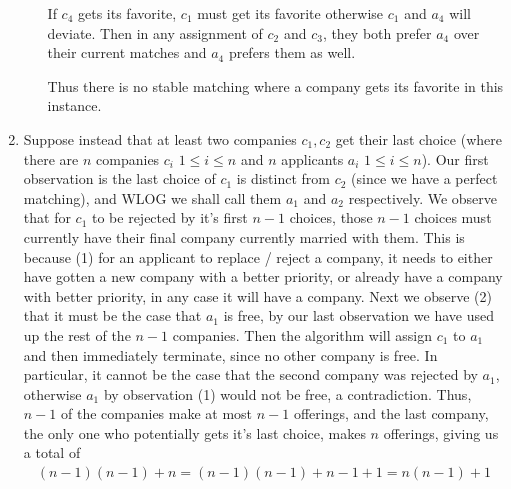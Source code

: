 \documentclass[12pt]{article}
\theoremstyle{definitionstyle}
\begin{document}
\begin{enumerate}[leftmargin=\labelsep]
\begin{enumerate}
			If $c_4$ gets its favorite, $c_1$ must get its favorite otherwise $c_1$ and $a_4$ will deviate. Then in any assignment of $c_2$ and $c_3$, they both prefer $a_4$ over their current matches and $a_4$ prefers them as well.
			
			Thus there is no stable matching where a company gets its favorite in this instance.
		\end{enumerate}
		\item Suppose instead that at least two companies $c_1, c_2$ get their last choice (where there are $n$ companies $c_i$ $1 \leq i \leq n$ and $n$ applicants $a_i$ $1 \leq i \leq n$). Our first observation is the last choice of $c_1$ is distinct from $c_2$ (since we have a perfect matching), and WLOG we shall call them $a_1$ and $a_2$ respectively. We observe that for $c_1$ to be rejected by it's first $n-1$ choices, those $n-1$ choices must currently have their final company currently married with them. This is because (1) for an applicant to replace / reject a company, it needs to either have gotten a new company with a better priority, or already have a company with better priority, in any case it will have a company. Next we observe (2) that it must be the case that $a_1$ is free, by our last observation we have used up the rest of the $n-1$ companies. Then the algorithm will assign $c_1$ to $a_1$ and then immediately terminate, since no other company is free. In particular, it cannot be the case that the second company was rejected by $a_1$, otherwise $a_1$ by observation (1) would not be free, a contradiction. Thus, $n-1$ of the companies make at most $n-1$ offerings, and the last company, the only one who potentially gets it's last choice, makes $n$ offerings, giving us a total of
		\begin{align*}
			(n-1)(n-1) + n = (n-1)(n-1) + n-1 + 1 = n(n-1) + 1
		\end{align*}
		

\end{enumerate}
\end{document}
